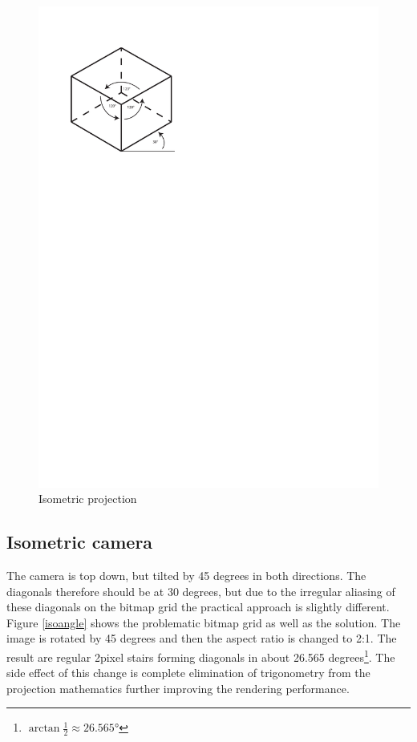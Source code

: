 \documentclass[11pt,oneside, final]{fithesis2}
\begin{document}
\begin{figure}[htp]
	\centering
	\includegraphics[clip=true,trim=0 205mm 100mm 0]{thesis-isobox}
	\caption{Isometric projection}
	\label{isometric}
\end{figure}

\subsection{Isometric camera}
The camera is top down, but tilted by 45 degrees in both directions. The diagonals therefore should be at 30 degrees, but due to the irregular aliasing of these diagonals on the bitmap grid the practical approach is slightly different. Figure \ref{isoangle} shows the problematic bitmap grid as well as the solution. The image is rotated by 45 degrees and then the aspect ratio is changed to 2:1. The result are regular 2pixel stairs forming diagonals in about 26.565 degrees\footnote{\begin{math}\arctan \frac{1}{2} \approx 26.565\si{\degree}\end{math}}. The side effect of this change is complete elimination of trigonometry from the projection mathematics further improving the rendering performance.
\end{document}
